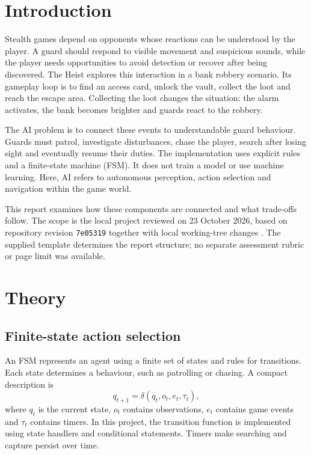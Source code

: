 \documentclass[fleqn,10pt]{SelfArx}
\begin{document}
\maketitle
\tableofcontents
\thispagestyle{empty}

\section{Introduction}
Stealth games depend on opponents whose reactions can be understood by the player. A guard should respond to visible movement and suspicious sounds, while the player needs opportunities to avoid detection or recover after being discovered. The Heist explores this interaction in a bank robbery scenario. Its gameplay loop is to find an access card, unlock the vault, collect the loot and reach the escape area. Collecting the loot changes the situation: the alarm activates, the bank becomes brighter and guards react to the robbery.

The AI problem is to connect these events to understandable guard behaviour. Guards must patrol, investigate disturbances, chase the player, search after losing sight and eventually resume their duties. The implementation uses explicit rules and a finite-state machine (FSM). It does not train a model or use machine learning. Here, AI refers to autonomous perception, action selection and navigation within the game world.

This report examines how these components are connected and what trade-offs follow. The scope is the local project reviewed on 23 October 2026, based on repository revision \texttt{7e05319} together with local working-tree changes \cite{project}. The supplied template determines the report structure; no separate assessment rubric or page limit was available.

\section{Theory}
\subsection{Finite-state action selection}
An FSM represents an agent using a finite set of states and rules for transitions. Each state determines a behaviour, such as patrolling or chasing. A compact description is
\begin{equation}
q_{t+1}=\delta(q_t,o_t,e_t,\tau_t),
\end{equation}
where $q_t$ is the current state, $o_t$ contains observations, $e_t$ contains game events and $\tau_t$ contains timers. In this project, the transition function is implemented using state handlers and conditional statements. Timers make searching and capture persist over time.
\end{document}
